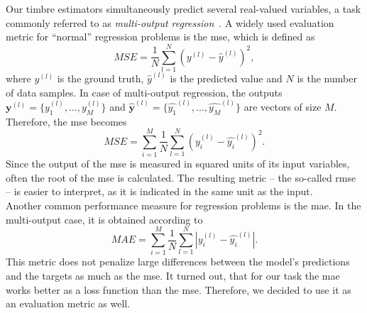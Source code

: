 Our timbre estimators simultaneously predict several real-valued variables, a task commonly referred to as \textit{multi-output regression}~\cite{borchani2015survey}. A widely used evaluation metric for \enquote{normal} regression problems is the \gls{mse}, which is defined as
\begin{equation}
MSE = \frac{1}{N} \sum_{l=1}^{N} (y^{(l)} - \hat{y}^{(l)})^2,
\end{equation}
where $y^{(l)}$ is the ground truth, $\hat{y}^{(l)}$ is the predicted value and $N$ is the number of data samples.
In case of multi-output regression, the outputs $\boldsymbol{y}^{(l)} = \{ y_1^{(l)},...,y_M^{(l)} \}$ and $\boldsymbol{\hat{y}}^{(l)} = \{ \hat{y_1}^{(l)},...,\hat{y_M}^{(l)} \}$ are vectors of size $M$. Therefore, the \gls{mse} becomes
\begin{equation}
MSE = \sum_{i=1}^{M} \frac{1}{N} \sum_{l=1}^{N} (y_i^{(l)} - \hat{y_i}^{(l)})^2.
\end{equation}
Since the output of the \gls{mse} is measured in squared units of its input variables, often the root of the \gls{mse} is calculated. The resulting metric -- the so-called \gls{rmse} -- is easier to interpret, as it is indicated in the same unit as the input.\\

Another common performance measure for regression problems is the \gls{mae}. In the multi-output case, it is obtained according to
\begin{equation}
MAE = \sum_{i=1}^{M} \frac{1}{N} \sum_{l=1}^{N} |y_i^{(l)} - \hat{y_i}^{(l)}|.
\end{equation}
This metric does not penalize large differences between the model's predictions and the targets as much as the \gls{mse}. It turned out, that for our task the \gls{mae} works better as a loss function than the \gls{mse}. Therefore, we decided to use it as an evaluation metric as well.